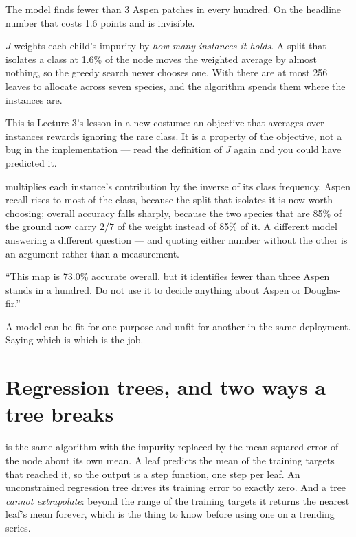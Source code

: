 \documentclass[11pt,a4paper]{article}
\begin{document}
The model finds fewer than 3 Aspen patches in every hundred. On the headline
number that costs 1.6 points and is invisible.

\begin{failbox}[title={Failure condition --- why the tree cannot see Aspen}]
$J$ weights each child's impurity by \emph{how many instances it holds}. A
split that isolates a class at 1.6\% of the node moves the weighted average by
almost nothing, so the greedy search never chooses one. With
 there are at most 256 leaves to allocate across seven
species, and the algorithm spends them where the instances are.

This is Lecture 3's lesson in a new costume: an objective that averages over
instances rewards ignoring the rare class. It is a property of the objective,
not a bug in the implementation --- read the definition of $J$ again and you
could have predicted it.
\end{failbox}

 multiplies each instance's contribution by the
inverse of its class frequency. Aspen recall rises to most of the class,
because the split that isolates it is now worth choosing; overall accuracy
falls sharply, because the two species that are 85\% of the ground now carry
$2/7$ of the weight instead of 85\% of it. A different model answering a
different question --- and quoting either number without the other is an
argument rather than a measurement.

\begin{keybox}[title={The sentence the agency needs}]
``This map is 73.0\% accurate overall, but it identifies fewer than three Aspen
stands in a hundred. Do not use it to decide anything about Aspen or
Douglas-fir.''

A model can be fit for one purpose and unfit for another in the same
deployment. Saying which is which is the job.
\end{keybox}

\section{Regression trees, and two ways a tree breaks}

 is the same algorithm with the impurity replaced
by the mean squared error of the node about its own mean. A leaf predicts the
mean of the training targets that reached it, so the output is a step function,
one step per leaf. An unconstrained regression tree drives its training error
to exactly zero. And a tree \emph{cannot extrapolate}: beyond the range of the
training targets it returns the nearest leaf's mean forever, which is the thing
to know before using one on a trending series.
\end{document}
